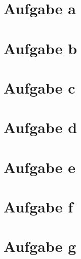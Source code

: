 \section{Aufgabe a}


\section{Aufgabe b}


\section{Aufgabe c}


\section{Aufgabe d}


\section{Aufgabe e}


\section{Aufgabe f}


\section{Aufgabe g}

